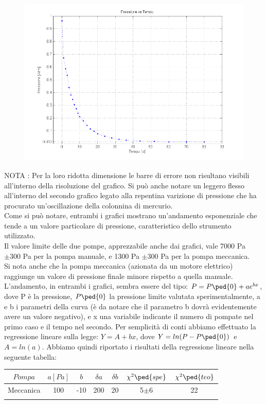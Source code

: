 \documentclass[a4paper,11pt]{article}
\begin{document}
\begin{figure}[htbp]
\centering
\includegraphics[width=15cm]{grafico_Pt.png}
\end{figure}


NOTA : Per la loro ridotta dimensione le barre di errore non risultano visibili all'interno della risoluzione del grafico. Si può anche notare un leggero flesso all'interno del secondo grafico legato alla repentina varizione di pressione che ha procurato un'oscillazione della colonnina di mercurio.\\


Come si può notare, entrambi i grafici mostrano un'andamento esponenziale che tende a un valore particolare di pressione, caratteristico dello strumento utilizzato. \\
Il valore limite delle due pompe, apprezzabile anche dai grafici, vale 7000 Pa $\pm 300$ Pa per la pompa manuale, e 1300 Pa $\pm 300$ Pa per la pompa meccanica.\\
Si nota anche che la pompa meccanica (azionata da un motore elettrico) raggiunge un valore di pressione finale minore rispetto a quella manuale.
L'andamento, in entrambi i grafici, sembra essere del tipo: $P=P\ped{0}+ae^{bx}$, dove P è la pressione, $P\ped{0}$ la pressione limite valutata sperimentalmente, a e b i parametri della curva (è da notare che il parametro b dovrà evidentemente avere un valore negativo), e x una variabile indicante il numero di pompate nel primo caso e il tempo nel secondo. Per semplicità di conti abbiamo effettuato la regressione lineare sulla legge: $Y=A+bx$, dove $Y=ln(P-P\ped{0})$ e $A=ln(a)$. Abbiamo quindi riportato i risultati della regressione lineare nella seguente tabella:
\begin{center}
\begin{tabular}{|c|c|c|c|c|c|c|}
\hline \rule[-2ex]{0pt}{5.5ex} $Pompa$ & $a [Pa]$ & $b$ & $\delta$$a$ & $\delta$$b$ & $\chi^{2}\ped{spe}$ & $\chi^{2}\ped{teo}$\\
\hline \rule[-2ex]{0pt}{5.5ex} Meccanica & 100 & -10 & 200 & 20 & 5$\pm$6 & 22 \\
\hline \rule[-2ex]{0pt}{5.5ex} & & & & & & \\
 \hline
\end{tabular}
\end{center}
\vspace{5pt}
\end{document}
